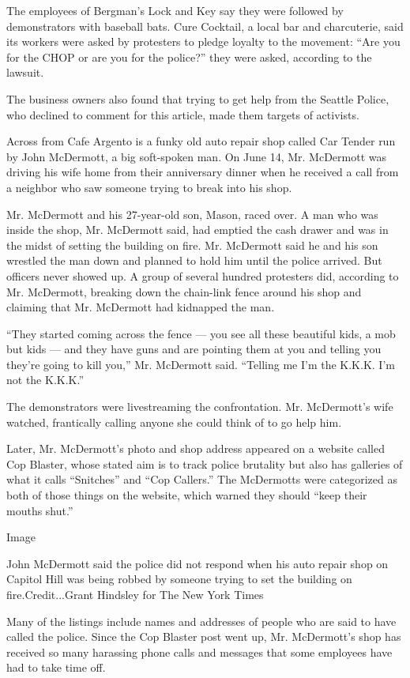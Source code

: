 The employees of Bergman's Lock and Key say they were followed by
demonstrators with baseball bats. Cure Cocktail, a local bar and
charcuterie, said its workers were asked by protesters to pledge loyalty
to the movement: ``Are you for the CHOP or are you for the police?''
they were asked, according to the lawsuit.

The business owners also found that trying to get help from the Seattle
Police, who declined to comment for this article, made them targets of
activists.

Across from Cafe Argento is a funky old auto repair shop called Car
Tender run by John McDermott, a big soft-spoken man. On June 14, Mr.
McDermott was driving his wife home from their anniversary dinner when
he received a call from a neighbor who saw someone trying to break into
his shop.

Mr. McDermott and his 27-year-old son, Mason, raced over. A man who was
inside the shop, Mr. McDermott said, had emptied the cash drawer and was
in the midst of setting the building on fire. Mr. McDermott said he and
his son wrestled the man down and planned to hold him until the police
arrived. But officers never showed up. A group of several hundred
protesters did, according to Mr. McDermott, breaking down the chain-link
fence around his shop and claiming that Mr. McDermott had kidnapped the
man.

``They started coming across the fence --- you see all these beautiful
kids, a mob but kids --- and they have guns and are pointing them at you
and telling you they're going to kill you,'' Mr. McDermott said.
``Telling me I'm the K.K.K. I'm not the K.K.K.''

The demonstrators were livestreaming the confrontation. Mr. McDermott's
wife watched, frantically calling anyone she could think of to go help
him.

Later, Mr. McDermott's photo and shop address appeared on a website
called Cop Blaster, whose stated aim is to track police brutality but
also has galleries of what it calls ``Snitches'' and ``Cop Callers.''
The McDermotts were categorized as both of those things on the website,
which warned they should ``keep their mouths shut.''

Image

John McDermott said the police did not respond when his auto repair shop
on Capitol Hill was being robbed by someone trying to set the building
on fire.Credit...Grant Hindsley for The New York Times

Many of the listings include names and addresses of people who are said
to have called the police. Since the Cop Blaster post went up, Mr.
McDermott's shop has received so many harassing phone calls and messages
that some employees have had to take time off.

